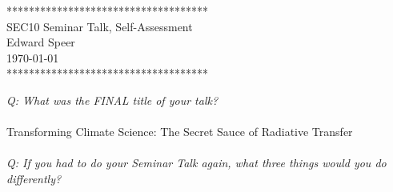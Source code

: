 \documentclass{article}
\begin{document}

    \begin{center}
        ************************************ \\
        SEC10 Seminar Talk, Self-Assessment \\
        Edward Speer \\
        \today \\
        ************************************
    \end{center}

    \noindent \emph{Q: What was the FINAL title of your talk?}
    \\ \hfill \\
    Transforming Climate Science: The Secret Sauce of Radiative Transfer
    \\ \hfill \\
    \noindent \emph{Q: If you had to do your Seminar Talk again, what three
                       things would you do differently?}
\end{document}
